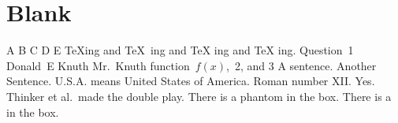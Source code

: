\documentclass{article}
\begin{document}
    \section{Blank}
        A B  C   D    E\newline
        \TeX ing and \TeX\ ing and \TeX{} ing and {\TeX} ing. \newline
        Question~1\newline          %
        Donald~E Knuth\newline      %
        Mr.~Knuth\newline           %
        function~$f(x)$,~2, and 3\newline         %
        A sentence. Another Sentence. \newline              %
        U.S.A. means United States of America. \newline     %
        Roman number XII\@. Yes. \newline                   %
        Thinker et al.\ made the double play.       %
        There is a phantom in the box. 
        There is a \phantom{phantom} in the box. 
\end{document}
